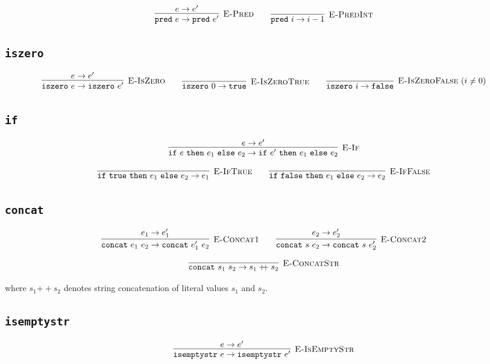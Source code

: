 \documentclass[11pt]{article}
\begin{document}
\[
\infer[\textsc{E-Pred}]
  {\texttt{pred}\ e \to \texttt{pred}\ e'}
  {e \to e'}
\qquad
\infer[\textsc{E-PredInt}]
  {\texttt{pred}\ i \to i-1}
  {}
\]

\subsection*{\texttt{iszero}}

\[
\infer[\textsc{E-IsZero}]
  {\texttt{iszero}\ e \to \texttt{iszero}\ e'}
  {e \to e'}
\qquad
\infer[\textsc{E-IsZeroTrue}]
  {\texttt{iszero}\ 0 \to \texttt{true}}
  {}
\qquad
\infer[\textsc{E-IsZeroFalse}\ (i \neq 0)]
  {\texttt{iszero}\ i \to \texttt{false}}
  {}
\]

\subsection*{\texttt{if}}

\[
\infer[\textsc{E-If}]
  {\texttt{if}\ e\ \texttt{then}\ e_1\ \texttt{else}\ e_2
   \to
   \texttt{if}\ e'\ \texttt{then}\ e_1\ \texttt{else}\ e_2}
  {e \to e'}
\]

\[
\infer[\textsc{E-IfTrue}]
  {\texttt{if}\ \texttt{true}\ \texttt{then}\ e_1\ \texttt{else}\ e_2 \to e_1}
  {}
\qquad
\infer[\textsc{E-IfFalse}]
  {\texttt{if}\ \texttt{false}\ \texttt{then}\ e_1\ \texttt{else}\ e_2 \to e_2}
  {}
\]

\subsection*{\texttt{concat}}

\[
\infer[\textsc{E-Concat1}]
  {\texttt{concat}\ e_1\ e_2 \to \texttt{concat}\ e_1'\ e_2}
  {e_1 \to e_1'}
\qquad
\infer[\textsc{E-Concat2}]
  {\texttt{concat}\ s\ e_2 \to \texttt{concat}\ s\ e_2'}
  {e_2 \to e_2'}
\]

\[
\infer[\textsc{E-ConcatStr}]
  {\texttt{concat}\ s_1\ s_2 \to s_1 \mathbin{+\!\!+} s_2}
  {}
\]

\noindent where $s_1 \mathbin{+\!\!+} s_2$ denotes string concatenation of literal values $s_1$ and $s_2$.

\subsection*{\texttt{isemptystr}}

\[
\infer[\textsc{E-IsEmptyStr}]
  {\texttt{isemptystr}\ e \to \texttt{isemptystr}\ e'}
  {e \to e'}
\]
\end{document}
